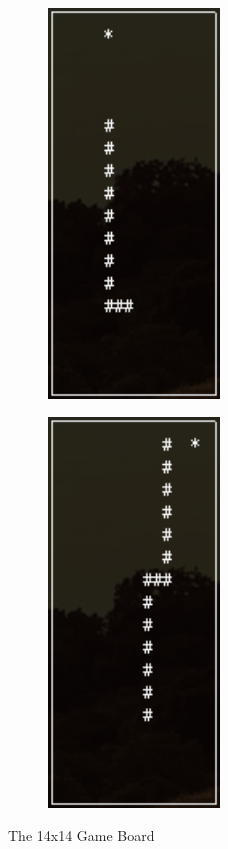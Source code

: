 \documentclass{article}
\begin{document}
\begin{figure}[h]
\centering
\begin{subfigure}{0.4\textwidth}
\centering
\includegraphics[width=0.5\textwidth]{game_board_1}
\label{fig:game_board_1}
\end{subfigure}%
\begin{subfigure}{0.4\textwidth}
\centering
\includegraphics[width=0.5\textwidth]{game_board_2}
\label{fig:game_board_2}
\end{subfigure}

\caption{The 14x14 Game Board}
\label{fig:game_board}
\end{figure}
 
\end{document}

